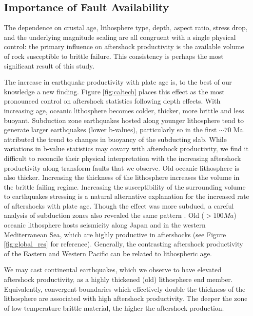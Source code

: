 \documentclass[draft]{agujournal2018}
\begin{document}
    
\subsection{Importance of Fault Availability}

The dependence on crustal age, lithosphere type, depth, aspect ratio, stress drop, and the underlying magnitude scaling are all congruent with a single physical control: the primary influence on aftershock productivity is the available volume of rock susceptible to brittle failure. This consistency is perhaps the most significant result of this study.

The increase in earthquake productivity with plate age is, to the best of our knowledge a new finding. Figure \ref{fig:caltech} places this effect as the most pronounced control on aftershock statistics following depth effects. With increasing age, oceanic lithosphere becomes colder, thicker, more brittle and less buoyant. Subduction zone earthquakes hosted along younger lithosphere tend to generate larger earthquakes (lower b-values), particularly so in the first $\sim70$ Ma. \citet{Nishikawa2014EarthquakeBuoyancy} attributed the trend to changes in buoyancy of the subducting slab. While variations in b-value statistics may covary with aftershock productivity, we find it difficult to reconcile their physical interpretation with the increasing aftershock productivity along transform faults that we observe. Old oceanic lithosphere is also thicker. Increasing the thickness of the lithosphere increases the volume in the brittle failing regime. Increasing the susceptibility of the surrounding volume to earthquakes stressing is a natural alternative explanation for the increased rate of aftershocks with plate age. Though the effect was more subdued, a careful analysis of subduction zones also revealed the same pattern \citep[Appendix of][]{Wetzler2016}. Old ($>100Ma$) oceanic lithosphere hosts seismicity along Japan and in the western Mediterranean Sea, which are highly productive in aftershocks (see Figure \ref{fig:global_res} for reference). Generally, the contrasting aftershock productivity of the Eastern and Western Pacific can be related to lithospheric age. 

We may cast continental earthquakes, which we observe to have elevated aftershock productivity, as a highly thickened (old) lithosphere end member.  Equivalently, convergent boundaries which effectively double the thickness of the lithosphere are associated with high aftershock productivity. The deeper the zone of low temperature brittle material, the higher the aftershock production.
\end{document}
